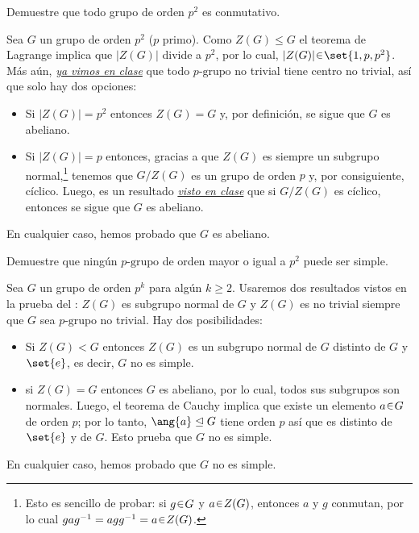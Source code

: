 \begin{ejer}
Demuestre que todo grupo de orden $p^2$ es conmutativo.
\end{ejer}
\begin{sol}[Demostración]
Sea $G$ un grupo de orden $p^2$ ($p$ primo). Como $Z(G) \leq G$ el teorema de Lagrange implica que $|Z(G)|$ divide a $p^2$, por lo cual, $|Z(G)| \en \set{1,p,p^2}$. Más aún, \href{https://drive.google.com/file/d/1Ya8QphqXaE-2Ao5ZX9yohvMls9xXDGwX/view?usp=drivesdk}{\emph{ya vimos en clase}} que todo $p\text{-grupo}$ no trivial tiene centro no trivial, así que solo hay dos opciones:
\begin{itemize}
    \item Si $|Z(G)| = p^2$ entonces $Z(G) = G$ y, por definición, se sigue que $G$ es abeliano.

    \item Si $|Z(G)| = p$ entonces, gracias a que $Z(G)$ es siempre un subgrupo normal,\footnote{Esto es sencillo de probar: si $g \en G$ y $a \en Z(G)$, entonces $a$ y $g$ conmutan, por lo cual $gag^{-1} = agg^{-1} = a \en Z(G)$.} tenemos que $G/Z(G)$ es un grupo de orden $p$ y, por consiguiente, cíclico. Luego, es un resultado \href{https://drive.google.com/file/d/1Ya8QphqXaE-2Ao5ZX9yohvMls9xXDGwX/view?usp=drivesdk}{\emph{visto en clase}} que si $G/Z(G)$ es cíclico, entonces se sigue que $G$ es abeliano.
\end{itemize}
En cualquier caso, hemos probado que $G$ es abeliano.
\end{sol}

\begin{ejer}
Demuestre que ningún $p\text{-grupo}$ de orden mayor o igual a $p^2$ puede ser simple.
\end{ejer}
\begin{sol}[Demostración]
Sea $G$ un grupo de orden $p^k$ para algún $k \geq 2$.
Usaremos dos resultados vistos en la prueba del : $Z(G)$ es subgrupo normal de $G$ y $Z(G)$ es no trivial siempre que $G$ sea $p\text{-grupo}$ no trivial. Hay dos posibilidades:
\begin{itemize}
    \item Si $Z(G) < G$ entonces $Z(G)$ es un subgrupo normal de $G$ distinto de $G$ y $\set{e}$, es decir, $G$ no es simple.

    \item si $Z(G) = G$ entonces $G$ es abeliano, por lo cual, todos sus subgrupos son normales. Luego, el teorema de Cauchy implica que existe un elemento $a \en G$ de orden $p$; por lo tanto, $\ang{a} \trianglelefteq G$ tiene orden $p$ así que es distinto de $\set{e}$ y de $G$. Esto prueba que $G$ no es simple. 
\end{itemize}
En cualquier caso, hemos probado que $G$ no es simple.
\end{sol}

